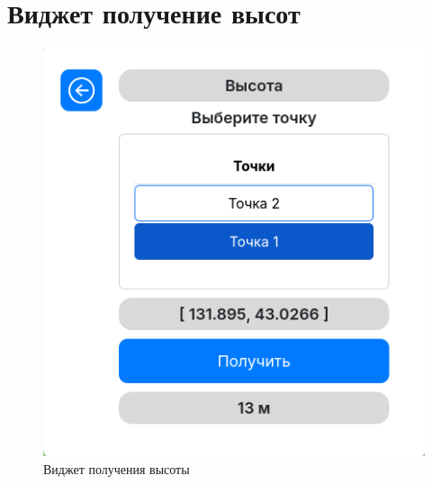 \chapter{Виджет получение высот}
\label{cha:elev}

\begin{figure}[h]  %
	\centering
	\includegraphics[height=1\textwidth]{imgs/elevation.png}  %
	\caption{Виджет получения высоты}  %
	\label{fig:elev}  %
\end{figure}
